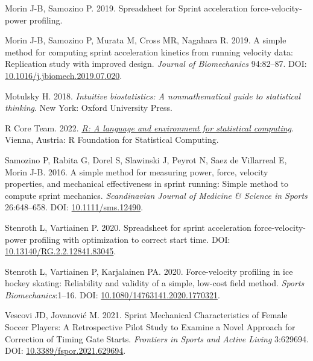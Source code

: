 \documentclass[fleqn,10pt]{wlpeerj} %
\newlength{\cslhangindent}
\newlength{\cslentryspacingunit} %
\newenvironment{CSLReferences}[2] %
 {%
  \setlength{\parindent}{0pt}
  \ifodd #1
  \let\oldpar\par
  \def\par{\hangindent=\cslhangindent\oldpar}
  \fi
  \setlength{\parskip}{#2\cslentryspacingunit}
 }%
 {}
\begin{document}
\begin{CSLReferences}{1}{0}
\leavevmode{}%
Morin J-B, Samozino P. 2019. Spreadsheet for {Sprint} acceleration force-velocity-power profiling.

\leavevmode{}%
Morin J-B, Samozino P, Murata M, Cross MR, Nagahara R. 2019. A simple method for computing sprint acceleration kinetics from running velocity data: {Replication} study with improved design. \emph{Journal of Biomechanics} 94:82--87. DOI: \href{https://doi.org/10.1016/j.jbiomech.2019.07.020}{10.1016/j.jbiomech.2019.07.020}.

\leavevmode{}%
Motulsky H. 2018. \emph{Intuitive biostatistics: A nonmathematical guide to statistical thinking}. {New York}: {Oxford University Press}.

\leavevmode{}%
R Core Team. 2022. \emph{\href{https://www.R-project.org/}{R: A language and environment for statistical computing}}. Vienna, Austria: R Foundation for Statistical Computing.

\leavevmode{}%
Samozino P, Rabita G, Dorel S, Slawinski J, Peyrot N, Saez de Villarreal E, Morin J-B. 2016. A simple method for measuring power, force, velocity properties, and mechanical effectiveness in sprint running: {Simple} method to compute sprint mechanics. \emph{Scandinavian Journal of Medicine \& Science in Sports} 26:648--658. DOI: \href{https://doi.org/10.1111/sms.12490}{10.1111/sms.12490}.

\leavevmode{}%
Stenroth L, Vartiainen P. 2020. Spreadsheet for sprint acceleration force-velocity-power profiling with optimization to correct start time. DOI: \href{https://doi.org/10.13140/RG.2.2.12841.83045}{10.13140/RG.2.2.12841.83045}.

\leavevmode{}%
Stenroth L, Vartiainen P, Karjalainen PA. 2020. Force-velocity profiling in ice hockey skating: Reliability and validity of a simple, low-cost field method. \emph{Sports Biomechanics}:1--16. DOI: \href{https://doi.org/10.1080/14763141.2020.1770321}{10.1080/14763141.2020.1770321}.

\leavevmode{}%
Vescovi JD, Jovanović M. 2021. Sprint {Mechanical Characteristics} of {Female Soccer Players}: {A Retrospective Pilot Study} to {Examine} a {Novel Approach} for {Correction} of {Timing Gate Starts}. \emph{Frontiers in Sports and Active Living} 3:629694. DOI: \href{https://doi.org/10.3389/fspor.2021.629694}{10.3389/fspor.2021.629694}.


\end{CSLReferences}
\end{document}
